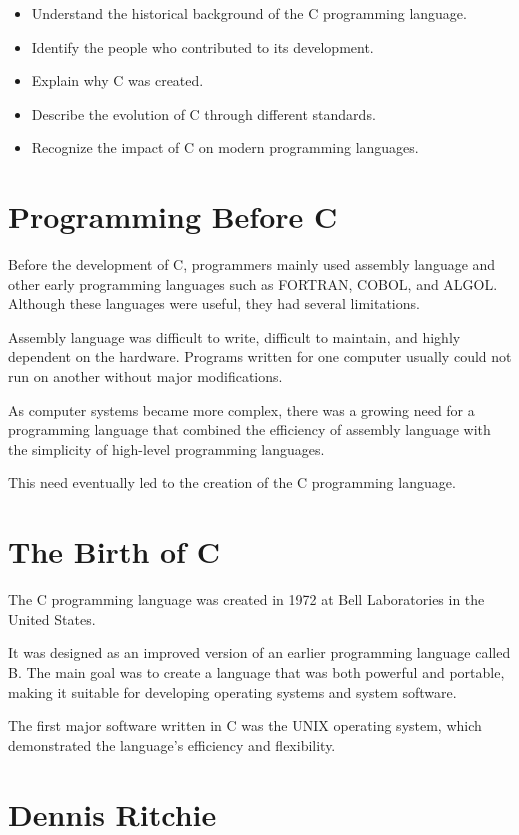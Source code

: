 \documentclass[12pt,openany]{book}
\begin{document}
\begin{itemize}
    \item Understand the historical background of the C programming language.
    \item Identify the people who contributed to its development.
    \item Explain why C was created.
    \item Describe the evolution of C through different standards.
    \item Recognize the impact of C on modern programming languages.
\end{itemize}

\section{Programming Before C}

Before the development of C, programmers mainly used assembly language and other early programming languages such as FORTRAN, COBOL, and ALGOL. Although these languages were useful, they had several limitations.

Assembly language was difficult to write, difficult to maintain, and highly dependent on the hardware. Programs written for one computer usually could not run on another without major modifications.

As computer systems became more complex, there was a growing need for a programming language that combined the efficiency of assembly language with the simplicity of high-level programming languages.

This need eventually led to the creation of the C programming language.

\section{The Birth of C}

The C programming language was created in 1972 at Bell Laboratories in the United States.

It was designed as an improved version of an earlier programming language called B. The main goal was to create a language that was both powerful and portable, making it suitable for developing operating systems and system software.

The first major software written in C was the UNIX operating system, which demonstrated the language's efficiency and flexibility.
\section{Dennis Ritchie}
\end{document}
